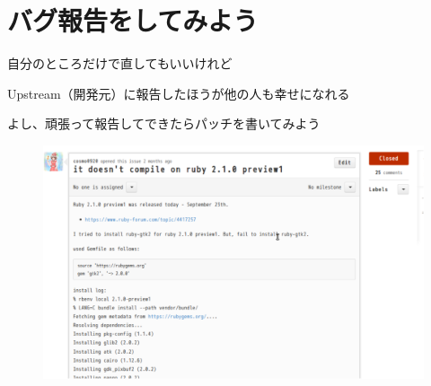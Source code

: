 \section{バグ報告をしてみよう}
\begin{frame}
\begin{itemize}
{\huge
\item 自分のところだけで直してもいいけれど
\item Upstream（開発元）に報告したほうが他の人も幸せになれる
\item よし、頑張って報告してできたらパッチを書いてみよう
}
\end{itemize}
\end{frame}

\begin{frame}
\begin{figure}
  \includegraphics[width=12cm]{img/issue180.pdf}
\end{figure}
\end{frame}
